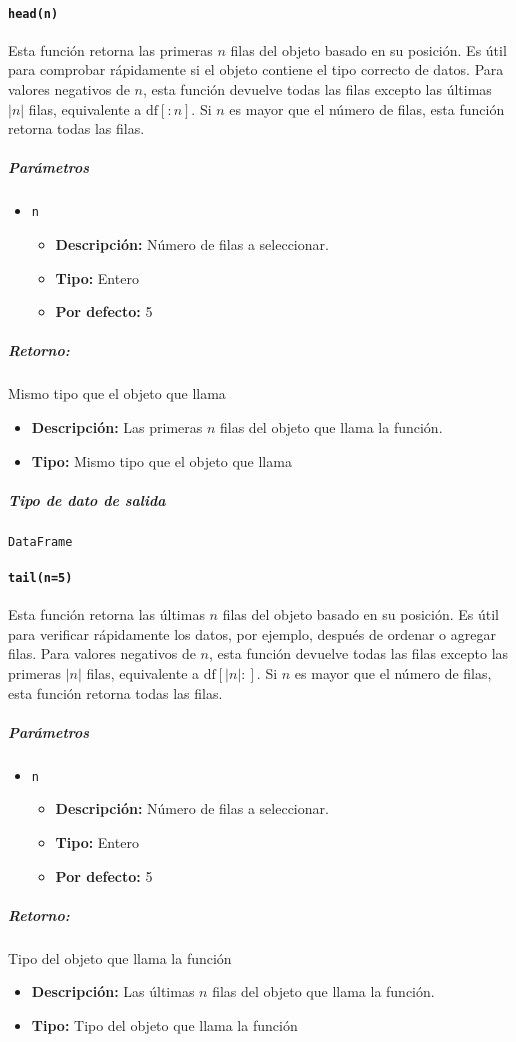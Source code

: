 \paragraph{\texttt{head(n)}} Esta función retorna las primeras \( n \) filas del objeto basado en su posición. Es útil para comprobar rápidamente si el objeto contiene el tipo correcto de datos.
Para valores negativos de \( n \), esta función devuelve todas las filas excepto las últimas \( |n| \) filas, equivalente a \( \text{df}[:n] \).
Si \( n \) es mayor que el número de filas, esta función retorna todas las filas.
\subparagraph{\textbf{Parámetros}}
\begin{itemize}
\item \texttt{n}
\begin{itemize}
\item \textbf{Descripción:} Número de filas a seleccionar.
\item \textbf{Tipo:} Entero
\item \textbf{Por defecto:} 5
\end{itemize}
\end{itemize}
\subparagraph{Retorno:} Mismo tipo que el objeto que llama
\begin{itemize}
\item \textbf{Descripción:} Las primeras \( n \) filas del objeto que llama la función.
\item \textbf{Tipo:} Mismo tipo que el objeto que llama
\end{itemize}
\subparagraph{Tipo de dato de salida} \texttt{DataFrame}
\paragraph{\texttt{tail(n=5)}} Esta función retorna las últimas \( n \) filas del objeto basado en su posición. Es útil para verificar rápidamente los datos, por ejemplo, después de ordenar o agregar filas.
Para valores negativos de \( n \), esta función devuelve todas las filas excepto las primeras \( |n| \) filas, equivalente a \( \text{df}[|n|:] \).
Si \( n \) es mayor que el número de filas, esta función retorna todas las filas.
\subparagraph{\textbf{Parámetros}}
\begin{itemize}
\item \texttt{n}
\begin{itemize}
\item \textbf{Descripción:} Número de filas a seleccionar.
\item \textbf{Tipo:} Entero
\item \textbf{Por defecto:} 5
\end{itemize}
\end{itemize}
\subparagraph{Retorno:} Tipo del objeto que llama la función
\begin{itemize}
\item \textbf{Descripción:} Las últimas \( n \) filas del objeto que llama la función.
\item \textbf{Tipo:} Tipo del objeto que llama la función
\end{itemize}

